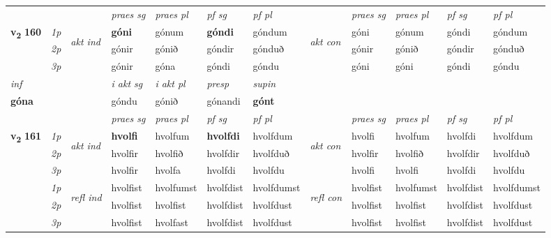 \begin{longtable}[l]{X>{\footnotesize\itshape}llXXXXlXXXX}
 & &   & \textit{praes sg}  & \textit{praes pl}    & \textit{ pf sg} & \textit{pf pl} & & \textit{praes sg}  & \textit{praes pl}    & \textit{pf sg} & \textit{pf pl }  \\ \cmidrule{4-7} \cmidrule{9-12}
 \multirow{2}{*}{{{\textbf{v{\textsubscript{2}}} \Large{\textbf{160}}}}}  & 1p & \multirow{3}{*}{\begin{turn}{90}\textit{akt ind}\end{turn}} & \textbf{góni} & gónum & \textbf{góndi} & góndum & \multirow{3}{*}{\begin{turn}{90}\textit{akt con}\end{turn}} &góni & gónum & góndi & góndum\\*
 & 2p &  &  gónir  & gónið & góndir & gónduð & & gónir & gónið & góndir & gónduð \\*
 & 3p &  & gónir & góna & góndi & góndu & & góni & góni& góndi & góndu \\*
\cmidrule{4-7} \cmidrule{9-12}

   {\textit{inf}} & &  & \textit{i akt sg} & \textit{i akt pl}   & \textit{presp} & \textit{supin}   \\*
  {\textbf{góna}} & && góndu  & gónið   & gónandi &  \textbf{gónt}   \\*

\midrule

 & &   & \textit{praes sg}  & \textit{praes pl}    & \textit{ pf sg} & \textit{pf pl} & & \textit{praes sg}  & \textit{praes pl}    & \textit{pf sg} & \textit{pf pl }  \\ \cmidrule{4-7} \cmidrule{9-12}
 \multirow{2}{*}{{{\textbf{v{\textsubscript{2}}} \Large{\textbf{161}}}}}  & 1p & \multirow{3}{*}{\begin{turn}{90}\textit{akt ind}\end{turn}} & \textbf{hvolfi} & hvolfum & \textbf{hvolfdi} & hvolfdum & \multirow{3}{*}{\begin{turn}{90}\textit{akt con}\end{turn}} &hvolfi & hvolfum & hvolfdi & hvolfdum\\*
 & 2p &  &  hvolfir  & hvolfið & hvolfdir & hvolfduð & & hvolfir & hvolfið & hvolfdir & hvolfduð \\*
 & 3p &  & hvolfir & hvolfa & hvolfdi & hvolfdu & & hvolfi & hvolfi& hvolfdi & hvolfdu \\*
\cmidrule{4-7} \cmidrule{9-12}
 & 1p & \multirow{3}{*}{\begin{turn}{90}\textit{refl ind}\end{turn}}  & hvolfist & hvolfumst & hvolfdist & hvolfdumst & \multirow{3}{*}{\begin{turn}{90}\textit{refl con}\end{turn}}  &hvolfist & hvolfumst & hvolfdist & hvolfdumst \\*
 & 2p &  & hvolfist & hvolfist & hvolfdist & hvolfdust & &hvolfist & hvolfist & hvolfdist & hvolfdust \\*
 & 3p  & & hvolfist & hvolfast & hvolfdist & hvolfdust & & hvolfist & hvolfist& hvolfdist & hvolfdust \\*
\cmidrule{4-7} \cmidrule{9-12}


\end{longtable}
